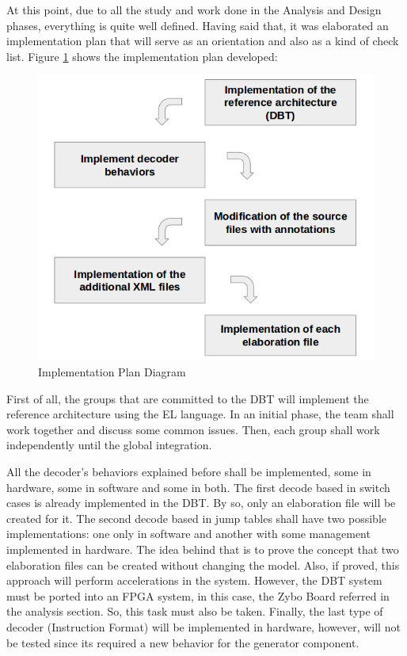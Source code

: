 At this point, due to all the study and work done in the Analysis and Design phases, everything is quite well defined. Having said that, it was elaborated an implementation plan that will serve as an orientation and also as a kind of check list. Figure \ref{fig:implementation_plan} shows the implementation plan developed:

\begin{figure}[!htb]
\centerline{
\includegraphics[scale=0.45]{images/implementation_plan}
}
\caption{Implementation Plan Diagram}
\label{fig:implementation_plan} 
\end{figure}

First of all, the groups that are committed to the DBT will implement the reference architecture using the EL language. In an initial phase, the team shall work together and discuss some common issues. Then, each group shall work independently until the global integration. 

All the decoder's behaviors explained before shall be implemented, some in hardware, some in software and some in both. The first decode based in switch cases is already implemented in the DBT. By so, only an elaboration file will be created for it. The second decode based in jump tables shall have two possible implementations: one only in software and another with some management implemented in hardware. The idea behind that is to prove the concept that two elaboration files can be created without changing the model. Also, if proved, this approach will perform accelerations in the system. However, the DBT system must be ported into an FPGA system, in this case, the Zybo Board referred in the analysis section. So, this task must also be taken. Finally, the last type of decoder (Instruction Format) will be implemented in hardware, however, will not be tested since its required a new behavior for the generator component. 

